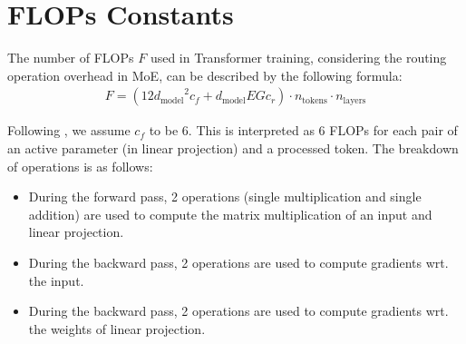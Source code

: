 \documentclass{article} %
\theoremstyle{plain}
\theoremstyle{definition}
\theoremstyle{remark}
\newcommand{\dmodel}{d_\text{model}}
\newcommand{\ntokens}{n_\text{tokens}}
\newcommand{\nlayers}{n_\text{layers}}
\newcommand{\janek}[1]{\textcolor{teal}{\small [jl: #1]}}
\begin{document}

\section{FLOPs Constants}\label{app:constants}

The number of FLOPs $F$ used in Transformer training, considering the routing operation overhead in MoE, can be described by the following formula:
\begin{align}
     F = (12{\dmodel}^2c_f + \dmodel EGc_r) \cdot \ntokens \cdot \nlayers
    \label{eq:flops_overhead}
\end{align}

Following \cite{hoffmann2022training}, we assume $c_f$ to be $6$. This is interpreted as 6 FLOPs for each pair of an active parameter (in linear projection) and a processed token. The breakdown of operations is as follows:
\begin{itemize}
    \item During the forward pass, 2 operations (single multiplication and single addition) are used to compute the matrix multiplication of an input and linear projection.
    \item During the backward pass, 2 operations are used to compute gradients wrt. the input.
    \item During the backward pass, 2 operations are used to compute gradients wrt. the weights of linear projection.
\end{itemize}
\end{document}
